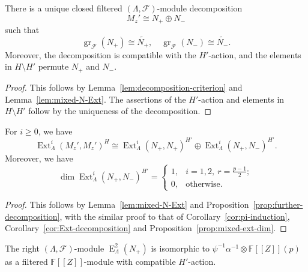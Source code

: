 \documentclass[11pt,a4paper]{article} %
\def\FF{\mathbb{F}}
\def\cF{\mathcal{F}}
\def\dim{\operatorname{dim}}
\def\E{\operatorname{E}}
\def\Ext{\operatorname{Ext}} %
\def\gr{\operatorname{gr}}
\begin{document}
\begin{proposition}\label{prop:further-decomposition}
There is a unique closed filtered $(\Lambda,\cF)$-module decomposition 
\[
M_z'\cong N_+\oplus N_-
\]
such that 
\[
\gr_{\cF}(N_+)\cong\widetilde{N_+},\quad\gr_{\cF}(N_-)\cong\widetilde{N_-}.
\]
Moreover, the decomposition is compatible with the $H'$-action, and the elements in $H\setminus H'$ permute $N_+$ and $N_-$.
\end{proposition}

\begin{proof}
    This follows by Lemma~\ref{lem:decomposition-criterion} and Lemma~\ref{lem:mixed-N-Ext}. The assertions of the $H'$-action and elements in $H\setminus H'$ follow by the uniqueness of the decomposition.
\end{proof}

\begin{corollary}\label{cor:mix-N-ext}
    For $i\ge0$, we have 
    \[
    \Ext^i_{\Lambda}(M_z',M_z')^H\cong\Ext^i_{\Lambda}(N_+,N_+)^{H'}\oplus\Ext^i_{\Lambda}(N_+,N_-)^{H'}.
    \]
    Moreover, we have 
    \[
    \dim\Ext^i_{\Lambda}(N_+,N_-)^{H'}= 
    \begin{cases}
        1,&i=1,2,~r=\frac{p-1}{2};\\
        0,&\text{otherwise}.            
    \end{cases}
    \]
\end{corollary}

\begin{proof}
    This follows by Lemma~\ref{lem:mixed-N-Ext} and Proposition~\ref{prop:further-decomposition}, with the similar proof to that of Corollary~\ref{cor:pi-induction}, Corollary~\ref{cor:Ext-decomposition} and Proposition~\ref{prop:mixed-ext-dim}.
\end{proof}

\begin{lemma}\label{lem:N-dual}
    The right $(\Lambda,\cF)$-module $\E^2_\Lambda(N_+)$ is isomorphic to $\psi^{-1}\alpha^{-1}\otimes\FF[[Z]](p)$ as a filtered $\FF[[Z]]$-module with compatible $H'$-action.
\end{lemma}
\end{document}
